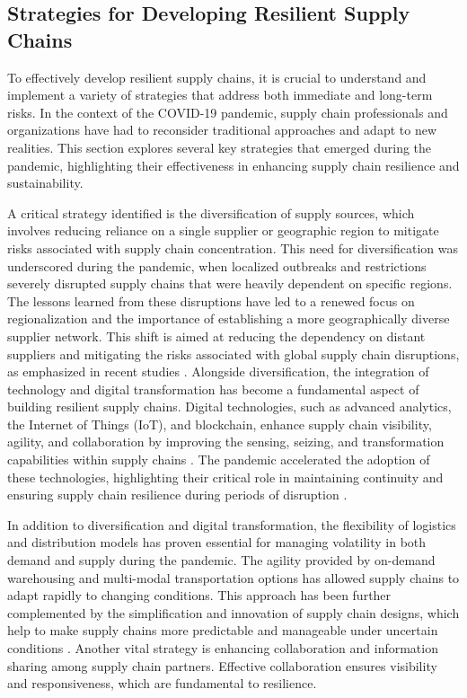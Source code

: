 \subsection{Strategies for Developing Resilient Supply Chains}

To effectively develop resilient supply chains, it is crucial to understand and implement a variety of strategies that address both immediate and long-term risks. In the context of the COVID-19 pandemic, supply chain professionals and organizations have had to reconsider traditional approaches and adapt to new realities. This section explores several key strategies that emerged during the pandemic, highlighting their effectiveness in enhancing supply chain resilience and sustainability.

A critical strategy identified is the diversification of supply sources, which involves reducing reliance on a single supplier or geographic region to mitigate risks associated with supply chain concentration. This need for diversification was underscored during the pandemic, when localized outbreaks and restrictions severely disrupted supply chains that were heavily dependent on specific regions. The lessons learned from these disruptions have led to a renewed focus on regionalization and the importance of establishing a more geographically diverse supplier network. This shift is aimed at reducing the dependency on distant suppliers and mitigating the risks associated with global supply chain disruptions, as emphasized in recent studies \parencite{Cherrafi2022DigitalEra}. Alongside diversification, the integration of technology and digital transformation has become a fundamental aspect of building resilient supply chains. Digital technologies, such as advanced analytics, the Internet of Things (IoT), and blockchain, enhance supply chain visibility, agility, and collaboration by improving the sensing, seizing, and transformation capabilities within supply chains \parencite{Cherrafi2022DigitalEra}. The pandemic accelerated the adoption of these technologies, highlighting their critical role in maintaining continuity and ensuring supply chain resilience during periods of disruption \parencite{Mishra2024RedefiningFactors, Cherrafi2022DigitalEra}.

In addition to diversification and digital transformation, the flexibility of logistics and distribution models has proven essential for managing volatility in both demand and supply during the pandemic. The agility provided by on-demand warehousing and multi-modal transportation options has allowed supply chains to adapt rapidly to changing conditions. This approach has been further complemented by the simplification and innovation of supply chain designs, which help to make supply chains more predictable and manageable under uncertain conditions \parencite{Mishra2024RedefiningFactors}. Another vital strategy is enhancing collaboration and information sharing among supply chain partners. Effective collaboration ensures visibility and responsiveness, which are fundamental to resilience. 

